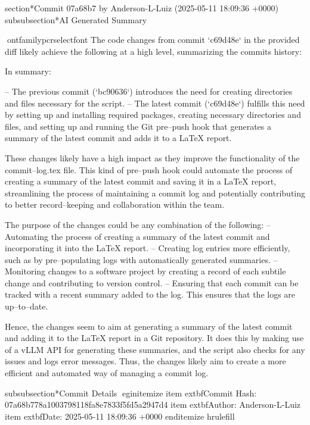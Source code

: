 \documentclass{article}
\begin{document}
section*{Commit 07a68b7 by Anderson-L-Luiz (2025-05-11 18:09:36 +0000)}
subsubsection*{AI Generated Summary}
{ontfamily{pcr}selectfont
 The code changes from commit `c69d48e` in the provided diff likely achieve the following at a high level, summarizing the commits history:

In summary:

-- The previous commit (`bc90636`) introduces the need for creating directories and files necessary for the script.
-- The latest commit (`c69d48e`) fulfills this need by setting up and installing required packages, creating necessary directories and files, and setting up and running the Git pre--push hook that generates a summary of the latest commit and adds it to a LaTeX report.

These changes likely have a high impact as they improve the functionality of the commit--log.tex file. This kind of pre--push hook could automate the process of creating a summary of the latest commit and saving it in a LaTeX report, streamlining the process of maintaining a commit log and potentially contributing to better record--keeping and collaboration within the team.

The purpose of the changes could be any combination of the following:
-- Automating the process of creating a summary of the latest commit and incorporating it into the LaTeX report.
-- Creating log entries more efficiently, such as by pre--populating logs with automatically generated summaries.
-- Monitoring changes to a software project by creating a record of each subtile change and contributing to version control.
-- Ensuring that each commit can be tracked with a recent summary added to the log. This ensures that the logs are up--to--date.

Hence, the changes seem to aim at generating a summary of the latest commit and adding it to the LaTeX report in a Git repository. It does this by making use of a vLLM API for generating these summaries, and the script also checks for any issues and logs error messages. Thus, the changes likely aim to create a more efficient and automated way of managing a commit log.
}
subsubsection*{Commit Details}
egin{itemize}
    item 	extbf{Commit Hash:} 07a68b778a1003798118fa8e7833f5fd5a2947d4
    item 	extbf{Author:} Anderson-L-Luiz
    item 	extbf{Date:} 2025-05-11 18:09:36 +0000
end{itemize}
hrulefill
\end{document}

